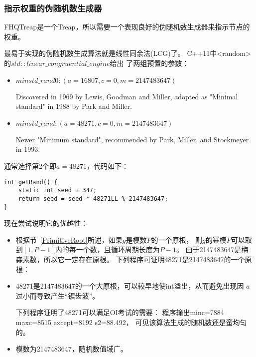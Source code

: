 \subsubsection{指示权重的伪随机数生成器}\label{WRG}

FHQTreap是一个Treap，所以需要一个表现良好的伪随机数生成器来指示节点的权重。

最易于实现的伪随机数生成算法就是线性同余法(LCG)了。
C++11中<random>的$std::linear\_congruential\_engine$给出
了两组预置的参数：
\begin{itemize}
	\item $minstd\_rand0:(a=16807, c=0, m=2147483647)$

	      Discovered in 1969 by Lewis, Goodman and Miller, adopted as
	      "Minimal standard" in 1988 by Park and Miller.
	\item $minstd\_rand:(a=48271, c=0, m=2147483647)$

	      Newer "Minimum standard", recommended by Park, Miller, and Stockmeyer in 1993.

\end{itemize}

通常选择第2个即$a=48271$，代码如下：

\begin{lstlisting}[title=minstd\_rand]
int getRand() {
    static int seed = 347;
    return seed = seed * 48271LL % 2147483647;
}
\end{lstlisting}

现在尝试说明它的优越性：

\begin{itemize}
	\item 根据节~\ref{PrimitiveRoot}所述，如果$g$是模数$P$的一个原根，
	      则$g$的幂模$P$可以取到$[1,P-1]$内的每一个数，且循环周期长度为$P-1$。
	      由于2147483647是梅森素数，所以它一定存在原根。
	      下列程序可证明48271是2147483647的一个原根：
	      
	\item 48271是2147483647的一个大原根，可以较早地使int溢出，从而避免出现因
	      $a$过小而导致产生``锯齿波''。

          下列程序证明了48271可以满足OI考试的需要：
          程序输出minc=7884 maxc=8515 except=8192 s2=88.492，
          可见该算法生成的随机数还是蛮均匀的。

          
    \item 模数为2147483647，随机数值域广。
\end{itemize}

